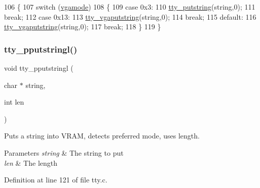 \begin{DoxyCode}
106                                   \{
107     \textcolor{keywordflow}{switch} (\hyperlink{a00179_af93b0649fdd1bea5b6d29ed37205aa2c_af93b0649fdd1bea5b6d29ed37205aa2c}{vgamode})
108     \{
109     \textcolor{keywordflow}{case} 0x3:
110         \hyperlink{a00179_a5b5bf610a57f3c59b2851fa2652081ec_a5b5bf610a57f3c59b2851fa2652081ec}{tty\_putstring}(\textcolor{keywordtype}{string},0);
111         \textcolor{keywordflow}{break};
112     \textcolor{keywordflow}{case} 0x13:
113         \hyperlink{a00179_a05ca3f5e64f38fec173b635ca8465415_a05ca3f5e64f38fec173b635ca8465415}{tty\_vgaputstring}(\textcolor{keywordtype}{string},0);
114         \textcolor{keywordflow}{break};
115     \textcolor{keywordflow}{default}:
116         \hyperlink{a00179_a05ca3f5e64f38fec173b635ca8465415_a05ca3f5e64f38fec173b635ca8465415}{tty\_vgaputstring}(\textcolor{keywordtype}{string},0);
117         \textcolor{keywordflow}{break};
118     \}
119 \}
\end{DoxyCode}
\mbox{\label{a00182_abaf93f9e56ddb7b10462070f59e534e4_abaf93f9e56ddb7b10462070f59e534e4}} 
\subsubsection{\texorpdfstring{tty\+\_\+pputstringl()}{tty\_pputstringl()}}
{\footnotesize\ttfamily void tty\+\_\+pputstringl (\begin{DoxyParamCaption}\item[{char $\ast$}]{string,  }\item[{int}]{len }\end{DoxyParamCaption})}



Puts a string into V\+R\+AM, detects preferred mode, uses length. 


\begin{DoxyParams}{Parameters}
{\em string} & The string to put \\
\hline
{\em len} & The length \\
\hline
\end{DoxyParams}


Definition at line 121 of file tty.\+c.



